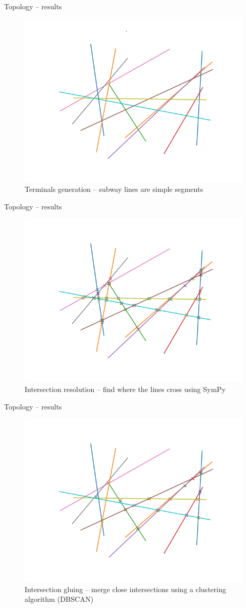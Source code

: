 \begin{frame}{Topology -- results}
	\begin{figure}
		\centering
		\includegraphics[width=0.7\linewidth]{images/net_1.png}
		\caption{Terminals generation -- subway lines are simple segments}
	\end{figure}
\end{frame}
\begin{frame}{Topology -- results}
	\begin{figure}
		\centering
		\includegraphics[width=0.7\linewidth]{images/net_2.png}
		\caption{Intersection resolution -- find where the lines cross using SymPy}
	\end{figure}
\end{frame}
\begin{frame}{Topology -- results}
	\begin{figure}
		\centering
		\includegraphics[width=0.7\linewidth]{images/net_3.png}
		\caption{Intersection gluing -- merge close intersections using a clustering algorithm (DBSCAN)}
	\end{figure}
\end{frame}
